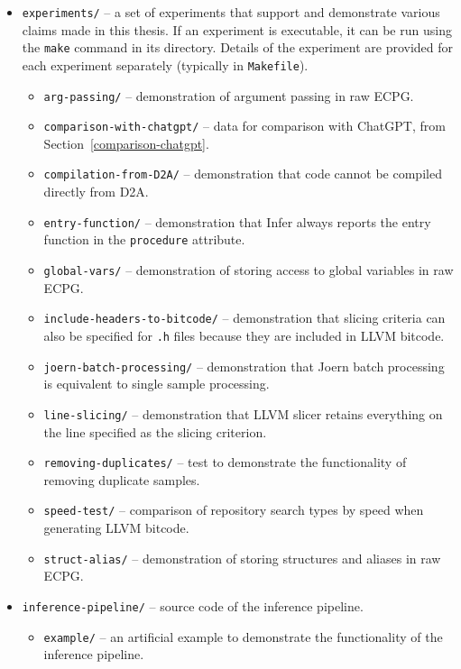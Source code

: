 \begin{itemize}
\begin{itemize}
\begin{itemize}
        \end{itemize}
        \item \texttt{experiments/} -- a set of experiments that support and demonstrate various claims made in this thesis. If an experiment is executable, it can be run using the \texttt{make} command in its directory. Details of the experiment are provided for each experiment separately (typically in \texttt{Makefile}). 
        \begin{itemize}
            \item \texttt{arg-passing/} -- demonstration of argument passing in raw ECPG.
            \item \texttt{comparison-with-chatgpt/} -- data for comparison with ChatGPT, from Section~\ref{comparison-chatgpt}.
            \item \texttt{compilation-from-D2A/} -- demonstration that code cannot be compiled directly from D2A.
            \item \texttt{entry-function/} -- demonstration that Infer always reports the entry function in the \texttt{procedure} attribute.
            \item \texttt{global-vars/} -- demonstration of storing access to global variables in raw ECPG.
            \item \texttt{include-headers-to-bitcode/} -- demonstration that slicing criteria can also be specified for \texttt{.h} files because they are included in LLVM bitcode.
            \item \texttt{joern-batch-processing/} -- demonstration that Joern batch processing is equivalent to single sample processing.
            \item \texttt{line-slicing/} -- demonstration that LLVM slicer retains everything on the line specified as the slicing criterion.
            \item \texttt{removing-duplicates/} -- test to demonstrate the functionality of removing duplicate samples.
            \item \texttt{speed-test/} -- comparison of repository search types by speed when generating LLVM bitcode.
            \item \texttt{struct-alias/} -- demonstration of storing structures and aliases in raw ECPG.
        \end{itemize}
        \item \texttt{inference-pipeline/} -- source code of the inference pipeline.
        \begin{itemize}
            \item \texttt{example/} -- an artificial example to demonstrate the functionality of the inference pipeline.

\end{itemize}
\end{itemize}
\end{itemize}
